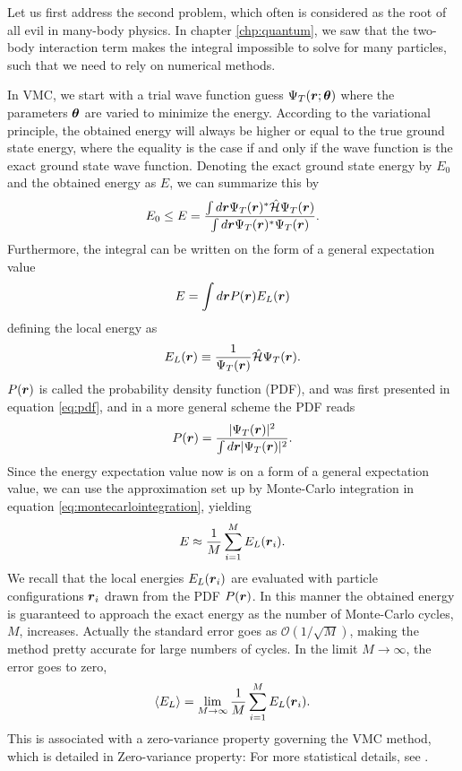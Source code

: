 Let us first address the second problem, which often is considered as the root of all evil in many-body physics. In chapter \ref{chp:quantum}, we saw that the two-body interaction term makes the integral impossible to solve for many particles, such that we need to rely on numerical methods. 

In VMC, we start with a trial wave function guess $\Psi_T(\boldsymbol{{r}};\boldsymbol{{\theta}})$ where the parameters $\boldsymbol{{\theta}}$ are varied to minimize the energy. According to the variational principle, the obtained energy will always be higher or equal to the true ground state energy, where the equality is the case if and only if the wave function is the exact ground state wave function. Denoting the exact ground state energy by $E_0$ and the obtained energy as $E$, we can summarize this by
\begin{equation}
E_0 \leq E = \frac{\int d\boldsymbol{{r}}\Psi_T(\boldsymbol{{r}})^*\hat{\mathcal{H}}\Psi_T(\boldsymbol{{r}})}{\int d\boldsymbol{{r}}\Psi_T(\boldsymbol{{r}})^*\Psi_T(\boldsymbol{{r}})}.
\end{equation}
Furthermore, the integral can be written on the form of a general expectation value
\begin{equation}
E = \int d\boldsymbol{{r}} P(\boldsymbol{{r}}) E_L(\boldsymbol{{r}})
\end{equation}
defining the local energy as
\begin{equation}
E_L(\boldsymbol{{r}})\equiv\frac{1}{\Psi_T(\boldsymbol{{r}})}\hat{\mathcal{H}}\Psi_T(\boldsymbol{{r}})
\label{eq:local energy}.
\end{equation}
$P(\boldsymbol{{r}})$ is called the probability density function (PDF), and was first presented in equation \eqref{eq:pdf}, and in a more general scheme the PDF reads
\begin{equation}
P(\boldsymbol{{r}})=\frac{|\Psi_T(\boldsymbol{{r}})|^2}{\int d\boldsymbol{{r}}|\Psi_T(\boldsymbol{{r}})|^2}.
\label{eq:probvmc}
\end{equation}
Since the energy expectation value now is on a form of a general expectation value, we can use the approximation set up by Monte-Carlo integration in equation \eqref{eq:montecarlointegration}, yielding 
\begin{equation}
E \approx \frac{1}{M}\sum_{i=1}^ME_L(\boldsymbol{{r}}_i) \label{eq:energysum}.
\end{equation}
We recall that the local energies $E_L(\boldsymbol{{r}}_i)$ are evaluated with particle configurations $\boldsymbol{{r}}_i$ drawn from the PDF $P(\boldsymbol{{r}})$. In this manner the obtained energy is guaranteed to approach the exact energy as the number of Monte-Carlo cycles, $M$, increases. Actually the standard error goes as $\mathcal{O}(1/\sqrt{M})$, making the method pretty accurate for large numbers of cycles. In the limit $M\rightarrow\infty$, the error goes to zero,
\begin{equation}
\langle E_L\rangle=\lim_{M\to\infty} \frac{1}{M}\sum_{i=1}^ME_L(\boldsymbol{{r}}_i).
\end{equation}
This is associated with a zero-variance property governing the VMC method, which is detailed in 
Zero-variance property: 
For more statistical details, see \cite{deb_variational_2014}. 

